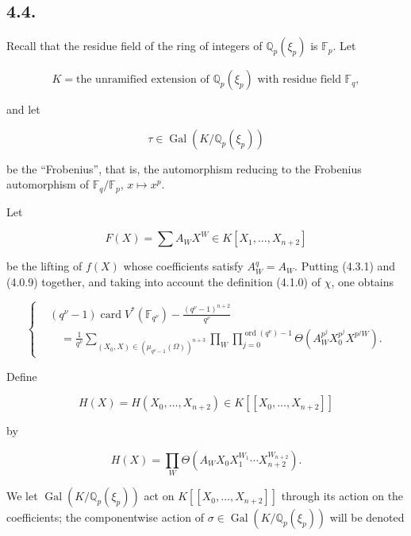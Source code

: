 \subsection*{4.4.}
Recall that the residue field of the ring of integers of
$\mathbb Q_p(\xi_p)$ is $\mathbb F_p$. Let

\begin{equation}\tag{4.4.0}
K=\text{the unramified extension of $\mathbb Q_p(\xi_p)$ with residue
field $\mathbb F_q$},
\end{equation}

and let

\begin{equation}\tag{4.4.1}
\tau\in\operatorname{Gal}(K/\mathbb Q_p(\xi_p))
\end{equation}

be the ``Frobenius'', that is, the automorphism reducing to the Frobenius
automorphism of $\mathbb F_q/\mathbb F_p$, $x\longmapsto x^p$.

Let

\begin{equation}\tag{4.4.2}
F(X)=\sum A_WX^W\in K[X_1,\ldots,X_{n+2}]
\end{equation}

be the lifting of $f(X)$ whose coefficients satisfy $A_W^q=A_W$.
Putting (4.3.1) and (4.0.9) together, and taking into account the
definition (4.1.0) of $\chi$, one obtains

\begin{equation}\tag{4.4.3}
\left\{
\begin{aligned}
&(q^\nu-1)\operatorname{card}V^*(\mathbb F_{q^\nu})
-\frac{(q^\nu-1)^{n+2}}{q^\nu}\\
&\quad=\frac1{q^\nu}
\sum_{(X_0,X)\in(\mu_{q^\nu-1}(\Omega))^{n+3}}
\prod_W\prod_{j=0}^{\operatorname{ord}(q^\nu)-1}
\Theta\!\left(A_W^{p^j}X_0^{p^j}X^{p^jW}\right).
\end{aligned}
\right.
\end{equation}

Define

\[
H(X)=H(X_0,\ldots,X_{n+2})\in K[[X_0,\ldots,X_{n+2}]]
\]

by

\begin{equation}\tag{4.4.4}
H(X)=\prod_W
\Theta\!\left(A_WX_0X_1^{W_1}\cdots X_{n+2}^{W_{n+2}}\right).
\end{equation}

We let $\operatorname{Gal}(K/\mathbb Q_p(\xi_p))$ act on
$K[[X_0,\ldots,X_{n+2}]]$ through its action on the coefficients; the
componentwise action of
$\sigma\in\operatorname{Gal}(K/\mathbb Q_p(\xi_p))$ will be denoted

